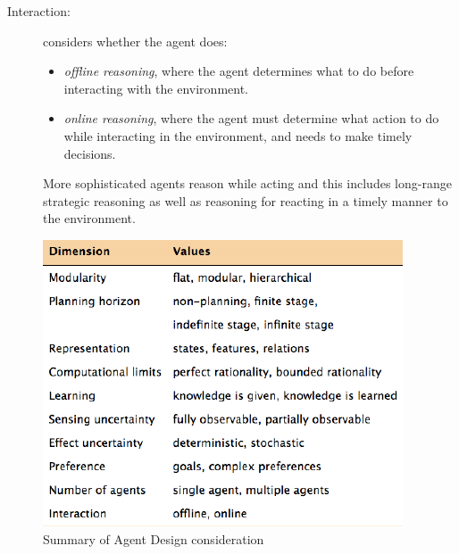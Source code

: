 \begin{description}
    \item [Interaction: ] considers whether the agent does:
                          \begin{itemize}
                            \item \emph{offline reasoning}, where the agent determines what to do before
                                  interacting with the environment.
                            \item \emph{online reasoning}, where the agent must determine what action to do 
                                  while interacting in the environment, and needs to make timely decisions.
                          \end{itemize}
                          More sophisticated agents reason while acting and this includes long-range
                          strategic reasoning as well as reasoning for reacting in a timely manner to
                          the environment.
\end{description}

\begin{figure}
    \caption{Summary of Agent Design consideration}
    \label{img:summary}
    \includegraphics[width=\textwidth]{Images/summary}
\end{figure}


